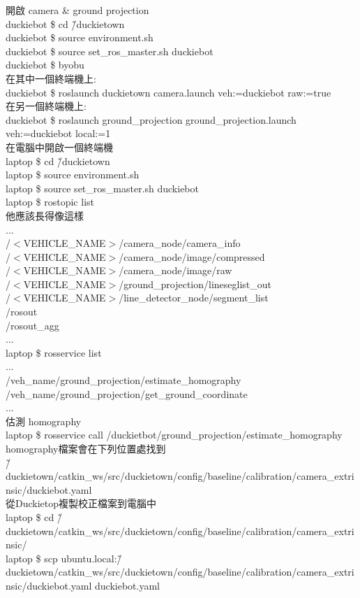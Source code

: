 \documentclass{article}
\begin{document}
開啟 camera \& ground projection
\\duckiebot \$ cd \~/duckietown
\\duckiebot \$ source environment.sh
\\duckiebot \$ source set\_ros\_master.sh duckiebot
\\duckiebot \$ byobu
\\在其中一個終端機上:
\\duckiebot \$ roslaunch duckietown camera.launch veh:=duckiebot raw:=true
\\在另一個終端機上:
\\duckiebot \$ roslaunch ground\_projection ground\_projection.launch  veh:=duckiebot local:=1
\\在電腦中開啟一個終端機
\\laptop \$ cd \~/duckietown
\\laptop \$ source environment.sh
\\laptop \$ source set\_ros\_master.sh duckiebot
\\laptop \$ rostopic list
\\他應該長得像這樣
\\...
\\/$<$VEHICLE\_NAME$>$/camera\_node/camera\_info
\\/$<$VEHICLE\_NAME$>$/camera\_node/image/compressed
\\/$<$VEHICLE\_NAME$>$/camera\_node/image/raw
\\/$<$VEHICLE\_NAME$>$/ground\_projection/lineseglist\_out
\\/$<$VEHICLE\_NAME$>$/line\_detector\_node/segment\_list
\\/rosout
\\/rosout\_agg
\\...
\\laptop \$ rosservice list
\\...
\\/veh\_name/ground\_projection/estimate\_homography
\\/veh\_name/ground\_projection/get\_ground\_coordinate
\\...
\\估測 homography
\\laptop \$ rosservice call /duckietbot/ground\_projection/estimate\_homography
\\homography檔案會在下列位置處找到
\\\~/duckietown/catkin\_ws/src/duckietown/config/baseline/calibration/camera\_extrinsic/duckiebot.yaml
\\從Duckietop複製校正檔案到電腦中
\\laptop \$ cd \~/duckietown/catkin\_ws/src/duckietown/config/baseline/calibration/camera\_extrinsic/
\\laptop \$ scp ubuntu\@duckiebot.local:\~/duckietown/catkin\_ws/src/duckietown/config/baseline/calibration/camera\_extrinsic/duckiebot.yaml duckiebot.yaml
\end{document}
